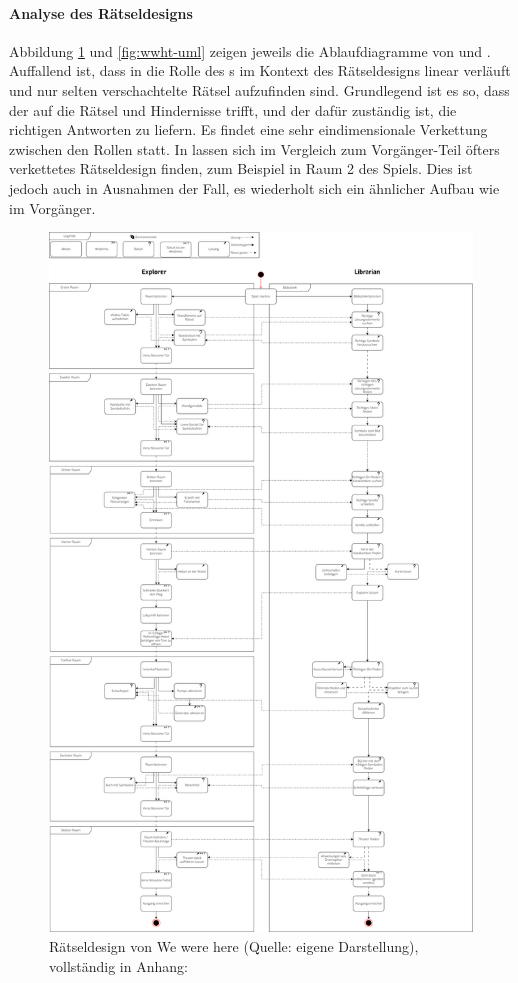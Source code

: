 \paragraph{Analyse des Rätseldesigns}
Abbildung \ref{fig:wwh-uml} und \ref{fig:wwht-uml} zeigen jeweils die Ablaufdiagramme von  und . Auffallend ist, dass in  die Rolle des s im Kontext des Rätseldesigns linear verläuft und nur selten verschachtelte Rätsel aufzufinden sind. Grundlegend ist es so, dass der  auf die Rätsel und Hindernisse trifft, und der  dafür zuständig ist, die richtigen Antworten zu liefern. Es findet eine sehr eindimensionale Verkettung zwischen den Rollen statt.
In  lassen sich im Vergleich zum Vorgänger-Teil öfters verkettetes Rätseldesign finden, zum Beispiel in Raum 2 des Spiels. Dies ist jedoch auch in Ausnahmen der Fall, es wiederholt sich ein ähnlicher Aufbau wie im Vorgänger.

\begin{figure}[ht]
\centering
\includegraphics[width=0.8\linewidth]{content/pictures/WeWereHereUML.png}
\caption{Rätseldesign von We were here (Quelle: eigene Darstellung), vollständig in Anhang: }
\label{fig:wwh-uml}
\end{figure}

